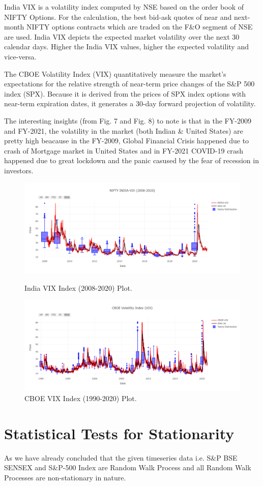 \documentclass[conference]{IEEEtran}
\begin{document}
India VIX is a volatility index computed by NSE based on the order book of NIFTY Options.
For the calculation, the best bid-ask quotes of near and next-month NIFTY options contracts which are traded on the F\&O segment of NSE are used. India VIX depicts the expected market volatility over the next 30 calendar days. Higher the India VIX values, higher the expected volatility and vice-versa.

The CBOE Volatility Index (VIX) quantitatively measure the market's expectations for the relative strength of near-term price changes of the S\&P 500 index (SPX). Because it is derived from the prices of SPX index options with near-term expiration dates, it generates a 30-day forward projection of volatility.

The interesting insights (from Fig. 7 and Fig. 8) to note is that in the FY-2009 and FY-2021, the volatility in the market (both Indian \& United States) are pretty high beacause in the FY-2009, Global Financial Crisis happened due to crash of Mortgage market in United States and in FY-2021 COVID-19 crash happened due to great lockdown and the panic casused by the fear of recession in investors.

\begin{figure}[htbp]
	\centering
	\includegraphics[width = 0.52 \textwidth]{images/INDIA-VIX (2008-2020).png}
	\caption{India VIX Index (2008-2020) Plot.}
	\includegraphics[width = 0.52 \textwidth]{images/CBOE-VIX.png}
	\caption{CBOE VIX Index (1990-2020) Plot.}
\end{figure}

\section{Statistical Tests for Stationarity}
As we have already concluded that the given timeseries data i.e. S\&P BSE SENSEX and S\&P-500 Index are Random Walk Process and all Random Walk Processes are non-stationary in nature.
\end{document}
